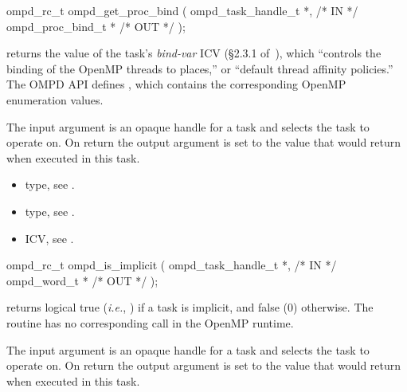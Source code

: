 %
\summary

\format
\cspecificstart
\begin{boxedcode}
ompd\_rc\_t ompd\_get\_proc\_bind (
  ompd\_task\_handle\_t        *,                           /* IN */
  ompd\_proc\_bind\_t          *                                  /* OUT */
); 
\end{boxedcode}
\cspecificend

\descr
{} returns the value of the task's
\emph{bind-var} ICV (\S2.3.1 of~\cite{OpenMP}), which ``controls the
binding of the OpenMP threads to places,'' or ``default thread
affinity policies.''
%
The OMPD API defines
, which
contains the corresponding OpenMP enumeration values.
%

\argdesc
The input argument  is an opaque handle for a task and selects the task to operate on.
On return the output argument  is set to the value that  would return when
executed in this task.
%

\crossreferences
\begin{itemize}
	\item {} type, see .
	\item {} type, see .
	\item {} ICV, see .
\end{itemize}

\summary

\format
\cspecificstart
\begin{boxedcode}
ompd\_rc\_t ompd\_is\_implicit (
  ompd\_task\_handle\_t  *,                                 /* IN */
  ompd\_word\_t        *                                         /* OUT */
); 
\end{boxedcode}
\cspecificend

\descr
{} returns logical true (\textit{i.e.}, )
if a task is implicit, and false (0) otherwise.
The routine has no corresponding call in the OpenMP runtime.

\argdesc
The input argument  is an opaque handle for a task and selects the task to operate on.
On return the output argument  is set to the value that  would return when
executed in this task.


